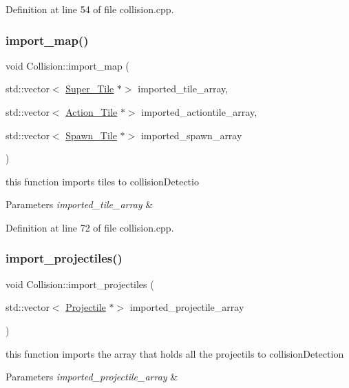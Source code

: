 Definition at line 54 of file collision.\+cpp.

\hypertarget{class_collision_aa5f6f529a4c59de675958a9bdf26b963}{}\label{class_collision_aa5f6f529a4c59de675958a9bdf26b963} 
\subsubsection{\texorpdfstring{import\+\_\+map()}{import\_map()}}
{\footnotesize\ttfamily void Collision\+::import\+\_\+map (\begin{DoxyParamCaption}\item[{std\+::vector$<$ \hyperlink{class_super___tile}{Super\+\_\+\+Tile} $\ast$$>$}]{imported\+\_\+tile\+\_\+array,  }\item[{std\+::vector$<$ \hyperlink{class_action___tile}{Action\+\_\+\+Tile} $\ast$$>$}]{imported\+\_\+actiontile\+\_\+array,  }\item[{std\+::vector$<$ \hyperlink{class_spawn___tile}{Spawn\+\_\+\+Tile} $\ast$$>$}]{imported\+\_\+spawn\+\_\+array }\end{DoxyParamCaption})}

this function imports tiles to collision\+Detectio 
\begin{DoxyParams}{Parameters}
{\em imported\+\_\+tile\+\_\+array} & \\
\hline
\end{DoxyParams}


Definition at line 72 of file collision.\+cpp.

\hypertarget{class_collision_afaaa2d44fbd17da3d3569133c04a9789}{}\label{class_collision_afaaa2d44fbd17da3d3569133c04a9789} 
\subsubsection{\texorpdfstring{import\+\_\+projectiles()}{import\_projectiles()}}
{\footnotesize\ttfamily void Collision\+::import\+\_\+projectiles (\begin{DoxyParamCaption}\item[{std\+::vector$<$ \hyperlink{class_projectile}{Projectile} $\ast$$>$}]{imported\+\_\+projectile\+\_\+array }\end{DoxyParamCaption})}

this function imports the array that holds all the projectils to collision\+Detection 
\begin{DoxyParams}{Parameters}
{\em imported\+\_\+projectile\+\_\+array} & \\
\hline
\end{DoxyParams}


